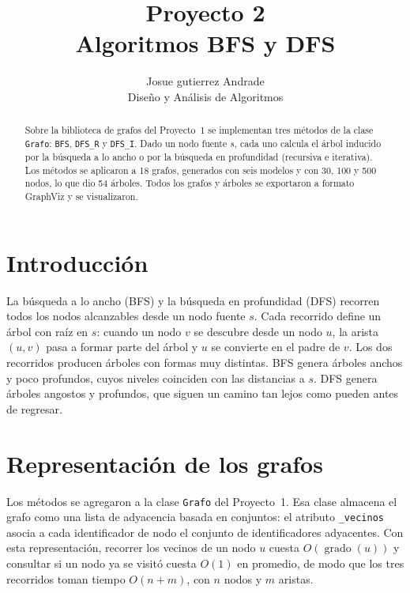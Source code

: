 \documentclass[11pt,letterpaper]{article}
\title{Proyecto 2\\Algoritmos BFS y DFS}
\author{Josue gutierrez Andrade\\[4pt]\small Diseño y Análisis de Algoritmos}
\date{}
\begin{document}
\maketitle

\begin{abstract}
Sobre la biblioteca de grafos del Proyecto~1 se implementan tres métodos de la
clase \texttt{Grafo}: \texttt{BFS}, \texttt{DFS\_R} y \texttt{DFS\_I}. Dado un nodo
fuente $s$, cada uno calcula el árbol inducido por la búsqueda a lo ancho o por la
búsqueda en profundidad (recursiva e iterativa). Los métodos se aplicaron a 18
grafos, generados con seis modelos y con 30, 100 y 500 nodos, lo que dio 54 árboles.
Todos los grafos y árboles se exportaron a formato GraphViz y se visualizaron.
\end{abstract}

\tableofcontents
\clearpage

\section{Introducción}

La búsqueda a lo ancho (BFS) y la búsqueda en profundidad (DFS) recorren todos los
nodos alcanzables desde un nodo fuente $s$. Cada recorrido define un árbol con raíz
en $s$: cuando un nodo $v$ se descubre desde un nodo $u$, la arista $(u, v)$ pasa a
formar parte del árbol y $u$ se convierte en el padre de $v$. Los dos recorridos
producen árboles con formas muy distintas. BFS genera árboles anchos y poco
profundos, cuyos niveles coinciden con las distancias a $s$. DFS genera árboles
angostos y profundos, que siguen un camino tan lejos como pueden antes de regresar.

\section{Representación de los grafos}

Los métodos se agregaron a la clase \texttt{Grafo} del Proyecto~1. Esa clase
almacena el grafo como una lista de adyacencia basada en conjuntos: el atributo
\texttt{\_vecinos} asocia a cada identificador de nodo el conjunto de
identificadores adyacentes. Con esta representación, recorrer los vecinos de un
nodo $u$ cuesta $O(\operatorname{grado}(u))$ y consultar si un nodo ya se visitó
cuesta $O(1)$ en promedio, de modo que los tres recorridos toman tiempo
$O(n + m)$, con $n$ nodos y $m$ aristas.
\end{document}
